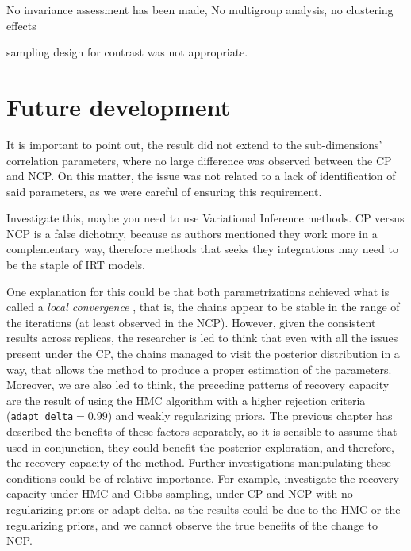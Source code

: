 No invariance assessment has been made, No multigroup analysis, no clustering effects

sampling design for contrast was not appropriate.

\section{Future development}

It is important to point out, the result did not extend to the sub-dimensions' correlation parameters, where no large difference was observed between the CP and NCP. On this matter, the issue was not related to a lack of identification of said parameters, as we were careful of ensuring this requirement.

Investigate this, maybe you need to use Variational Inference methods. CP versus NCP is a false dichotmy, because as authors mentioned they work more in a complementary way, therefore methods that seeks they integrations may need to be the staple of IRT models.

One explanation for this could be that both parametrizations achieved what is called a \textit{local convergence} \cite{Depaoli_2021}, that is, the chains appear to be stable in the range of the iterations (at least observed in the NCP). However, given the consistent results across replicas, the researcher is led to think that even with all the issues present under the CP, the chains managed to visit the posterior distribution in a way, that allows the method to produce a proper estimation of the parameters. Moreover, we are also led to think, the preceding patterns of recovery capacity are the result of using the HMC algorithm with a higher rejection criteria (\texttt{adapt\_delta}$=0.99$) and weakly regularizing priors. The previous chapter has described the benefits of these factors separately, so it is sensible to assume that used in conjunction, they could benefit the posterior exploration, and therefore, the recovery capacity of the method. Further investigations manipulating these conditions could be of relative importance. For example, investigate the recovery capacity under HMC and Gibbs sampling, under CP and NCP with no regularizing priors or adapt delta. as the results could be due to the HMC or the regularizing priors, and we cannot observe the true benefits of the change to NCP.